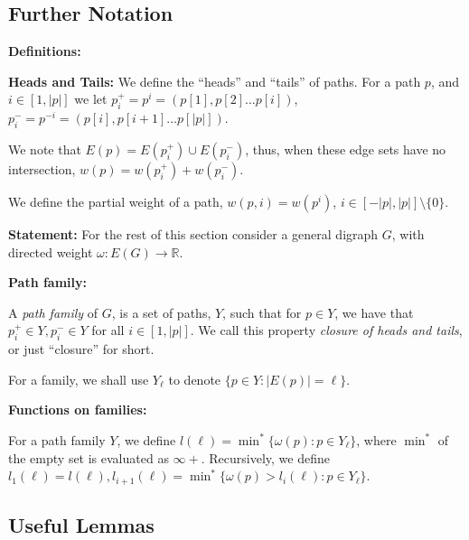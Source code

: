 \documentclass{article}
\newcommand{\edit}[1]{}%
\newcommand{\rough}[1]{}%
\begin{document}
{\subsection{Further Notation} \label{notation}

\textbf{Definitions:}

\textbf{Heads and Tails:} We define the ``heads'' and ``tails'' of paths. For a path $p$, and $i \in [1,|p|]$ we let $p_i^+ = p^i = (p[1],p[2]\dots p[i])$, $p_i^- = p^{-i} = (p[i], p[i+1]\dots p[|p|])$.\edit{ second form maybe more confusing than useful}


We note that $E(p) = E(p_i^+)\cup E(p_i^-)$, thus, when these edge sets have no intersection, $w(p) = w(p_i^+)+w(p_i^-)$.\edit{ this clarification feels distracting, maybe define $E(p)$ as a multiset?}

We define the partial weight of a path, $w(p,i) = w(p^i)$, $i \in [-|p|,|p|] \setminus \{0\} $.

\vspace{1.75em}

\textbf{Statement:} For the rest of this section consider a general digraph $G$, with directed weight $\omega: E(G) \to \mathbb{R}$.\edit{ awkward transition of generality, I use $w$ in previous definitions but am using $\omega$ now...}

\vspace{1.75em}

\textbf{Path family:} 

A \textit{path family} of $G$, is a set of paths, $Y$, such that for $p \in Y$, we have that $p_i^+ \in Y,p_i^- \in Y$ for all $i \in [1,|p|]$. We call this property \textit{closure of heads and tails}, or just ``closure'' for short. 

For a family, we shall use $Y_\ell$ to denote $\{ p \in Y : |E(p)| = \ell\}$.

\vspace{1.75em}

\textbf{Functions on families:}

For a path family $Y$, we define $l(\ell) =  \min^*\{\omega(p): p \in Y_\ell\}$, where $\min^*$ of the empty set is evaluated as $\infty +$. Recursively, we define $l_1(\ell) = l(\ell), l_{i+1}(\ell) = \min^*\{ \omega(p) > l_i(\ell): p \in Y_\ell\}$.\edit{ decide whether I'm cool letting $Y$ be implicit}

\rough{NOT DONE WITH BELOW SECTION}

\subsection{Useful Lemmas} \label{lemmas}

}
\end{document}
